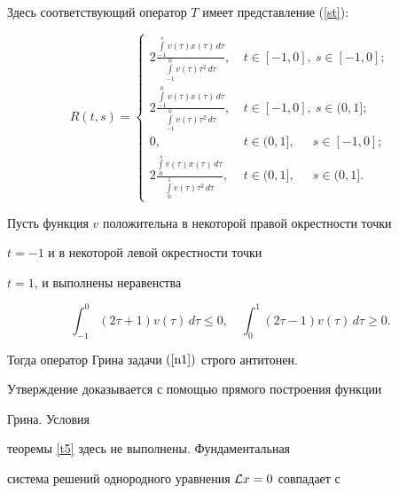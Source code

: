 Здесь соответствующий оператор $T$ имеет представление (\ref{st}):


$$


R(t,s)=


\begin{cases}


2\frac{\int\limits_{-1}^sv(\tau)x(\tau)\,d\tau}


{\int\limits_{-1}^0v(\tau)\tau^2\,d\tau},&\ t\in[-1,0],\ s\in[-1,0];\\


%


2\frac{\int\limits_{-1}^0v(\tau)x(\tau)\,d\tau}


{\int\limits_{-1}^0v(\tau)\tau^2\,d\tau},&\ t\in[-1,0],\ s\in(0,1];\\


0,&\ t\in(0,1],\phantom{-}\ s\in[-1,0];\\


2\frac{\int\limits_{0}^sv(\tau)x(\tau)\,d\tau}


{\int\limits_{0}^1v(\tau)\tau^2\,d\tau},&\ t\in(0,1],\phantom{-}\ s\in(0,1].


\end{cases}


$$





\begin{thms}


Пусть функция $v$ положительна в некоторой правой окрестности точки


$t=-1$ и в некоторой левой окрестности точки


$t=1$, и выполнены неравенства


$$


\int_{-1}^0(2\tau+1)v(\tau)\,d\tau\le0,\quad


\int_0^1(2\tau-1)v(\tau)\,d\tau\ge0.


$$


Тогда оператор Грина задачи $(\ref{n1})$ строго антитонен.


\end{thms}





Утверждение доказывается с помощью прямого построения функции


Грина. Условия


теоремы \ref{t5} здесь не выполнены. Фундаментальная


система решений однородного уравнения ${\cal L} x=0$ совпадает с


